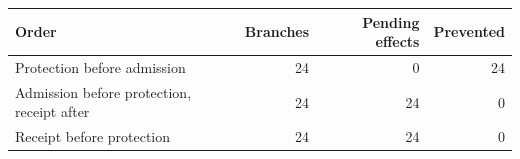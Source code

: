 \begin{tabular}{@{}lrrr@{}}\toprule
Order & Branches & Pending effects & Prevented\\\midrule
Protection before admission & 24 & 0 & 24\\
Admission before protection, receipt after & 24 & 24 & 0\\
Receipt before protection & 24 & 24 & 0\\
\bottomrule
\end{tabular}
